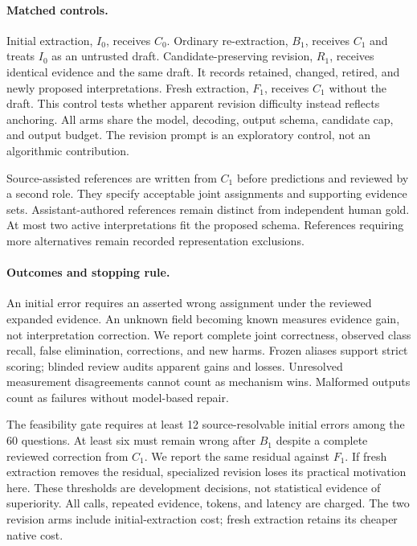 \documentclass[11pt]{article}
\begin{document}
\paragraph{Matched controls.}
Initial extraction, $I_0$, receives $C_0$.
Ordinary re-extraction, $B_1$, receives $C_1$ and treats $I_0$ as an untrusted draft.
Candidate-preserving revision, $R_1$, receives identical evidence and the same draft.
It records retained, changed, retired, and newly proposed interpretations.
Fresh extraction, $F_1$, receives $C_1$ without the draft.
This control tests whether apparent revision difficulty instead reflects anchoring.
All arms share the model, decoding, output schema, candidate cap, and output budget.
The revision prompt is an exploratory control, not an algorithmic contribution.

Source-assisted references are written from $C_1$ before predictions and reviewed by a second role.
They specify acceptable joint assignments and supporting evidence sets.
Assistant-authored references remain distinct from independent human gold.
At most two active interpretations fit the proposed schema.
References requiring more alternatives remain recorded representation exclusions.

\paragraph{Outcomes and stopping rule.}
An initial error requires an asserted wrong assignment under the reviewed expanded evidence.
An unknown field becoming known measures evidence gain, not interpretation correction.
We report complete joint correctness, observed class recall, false elimination, corrections, and new harms.
Frozen aliases support strict scoring; blinded review audits apparent gains and losses.
Unresolved measurement disagreements cannot count as mechanism wins.
Malformed outputs count as failures without model-based repair.

The feasibility gate requires at least 12 source-resolvable initial errors among the 60 questions.
At least six must remain wrong after $B_1$ despite a complete reviewed correction from $C_1$.
We report the same residual against $F_1$.
If fresh extraction removes the residual, specialized revision loses its practical motivation here.
These thresholds are development decisions, not statistical evidence of superiority.
All calls, repeated evidence, tokens, and latency are charged.
The two revision arms include initial-extraction cost; fresh extraction retains its cheaper native cost.
\end{document}
